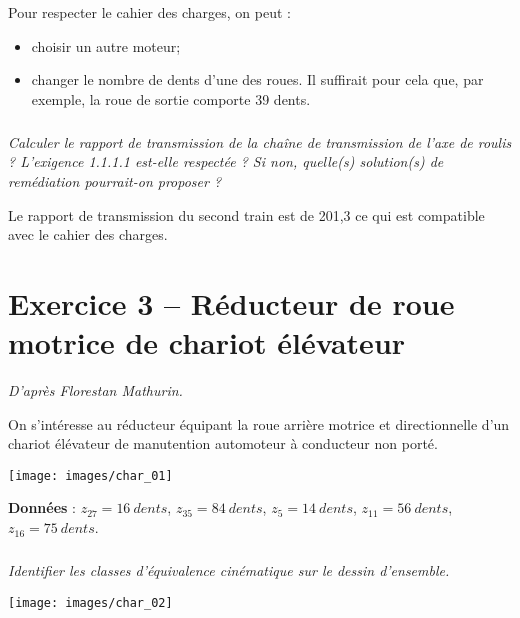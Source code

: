 \documentclass[10pt,fleqn]{article} %
\begin{document}
\begin{multicols}{2}
\begin{multicols}{2}
\begin{corrige}
Pour respecter le cahier des charges, on peut :
\begin{itemize}
\item choisir un autre moteur;
\item changer le nombre de dents d'une des roues. Il suffirait pour cela que,  par exemple, la roue de sortie comporte 39 dents. 
\end{itemize}
\end{corrige}
\else
\fi

\subparagraph{}
\textit{Calculer le rapport de transmission de la chaîne de transmission de l'axe de roulis ? L'exigence 1.1.1.1 est-elle respectée ? Si non, quelle(s) solution(s) de remédiation pourrait-on proposer ?}
\ifprof
\begin{corrige}
Le rapport de transmission du second train est de 201,3 ce qui est compatible avec le cahier des charges.
\end{corrige}
\else
\fi


\section*{Exercice 3 -- Réducteur de roue motrice de chariot élévateur}
\textit{D'après Florestan Mathurin.}
\setcounter{exo}{0}

\ifprof
\else

On s’intéresse au réducteur équipant la roue arrière motrice et directionnelle d’un chariot élévateur de manutention automoteur à conducteur non porté. 



\begin{center}
\texttt{[image: images/char\_01]}
\end{center}


\textbf{Données }: $z_{27} = \SI{16}{dents}$, $z_{35} = \SI{84}{dents}$, $z_{5} = \SI{14}{dents}$, $z_{11} = \SI{56}{dents}$, $z_{16} = \SI{75}{dents}$. 

\fi

\subparagraph{}
\textit{Identifier les classes d’équivalence cinématique sur le dessin d’ensemble. }
\ifprof
\begin{corrige}

\end{corrige}
\else
\begin{center}
\texttt{[image: images/char\_02]}
\end{center}

\fi




\end{multicols}
\end{multicols}
\end{document}
